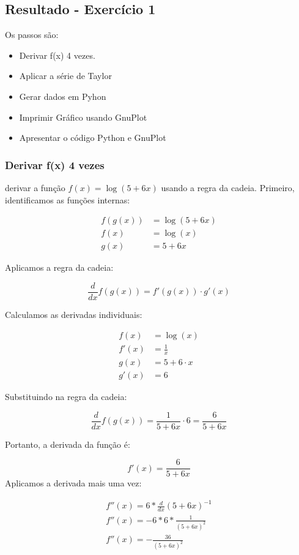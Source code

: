 \subsection{Resultado - Exercício 1}

Os passos são:
\begin{itemize}[leftmargin=3.5em, itemsep=-.5mm, topsep=0.5mm]
    \item Derivar f(x) 4 vezes.
    \item Aplicar a série de Taylor
    \item Gerar dados em Pyhon
    \item Imprimir Gráfico usando GnuPlot
    \item Apresentar o código Python e GnuPlot
 \end{itemize}

\subsubsection{Derivar f(x) 4 vezes}

derivar a função $f(x) = \log(5 + 6x)$ usando a regra da cadeia.
Primeiro, identificamos as funções internas:

\[
    \begin{aligned}
        f(g(x)) &= \log(5 + 6x) \\
        f(x) &= \log(x) \\
        g(x) &= 5 + 6x
    \end{aligned}
\]

Aplicamos a regra da cadeia:

\[
    \frac{d}{dx} f(g(x)) = f'(g(x)) \cdot g'(x)
\]

Calculamos as derivadas individuais:

\[
    \begin{aligned}
        f(x) &= \log(x) \\
        f'(x) &= \frac{1}{x} \\
        g(x) &= 5 + 6\cdot x \\
        g'(x) &= 6
    \end{aligned}
\]

Substituindo na regra da cadeia:

\[
    \frac{d}{dx} f(g(x)) = \frac{1}{5 + 6x} \cdot 6 = \frac{6}{5 + 6x}
\]

Portanto, a derivada da função é:

\[
    f'(x) = \frac{6}{5 + 6x}
\]
Aplicamos a derivada mais uma vez:

\[
    \begin{aligned}
        f''(x) = 6 * \frac{d}{dx} (5 + 6x)^{-1} \\
        f''(x) = - 6 * 6 *  \frac{1}{ (5 + 6x)^{2} } \\
        f''(x) = - \frac{36}{ (5 + 6x)^{2} } \\
    \end{aligned}
\]

